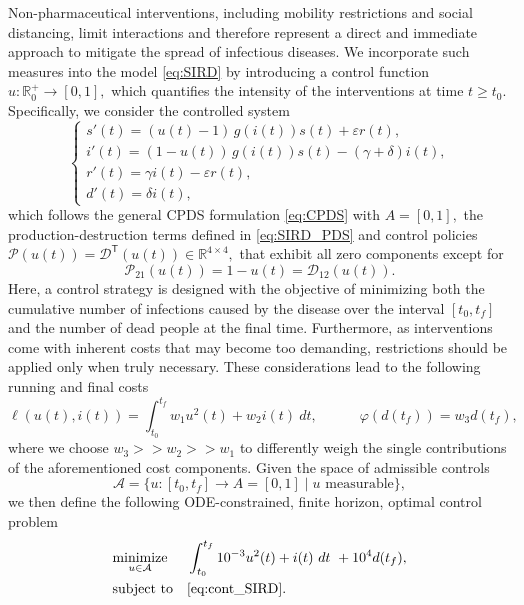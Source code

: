\documentclass[10pt]{article}
\theoremstyle{remark}
\newcommand{\R}{\mathbb{R}}
\newcommand{\tpose}{^\mathsf{T}}
\theoremstyle{definition}
\theoremstyle{remark}
\begin{document}
Non-pharmaceutical interventions, including mobility restrictions and social distancing, limit interactions and therefore represent a direct and immediate approach to mitigate the spread of infectious diseases. We incorporate such measures into the model \eqref{eq:SIRD} by introducing a control function $u: \mathbb{R}^+_0 \to [0,1],$ which quantifies the intensity of the interventions at time $t\geq t_0.$ Specifically, we consider the controlled system
\begin{equation}\label{eq:cont_SIRD}
    \begin{cases}
        s'(t) = (u(t)-1) \, g(i(t)) s(t) + \varepsilon r(t), \\
        i'(t) = (1-u(t)) \, g(i(t)) s(t) - (\gamma + \delta) i(t), \\
        r' (t) = \gamma i(t) - \varepsilon r(t), \\
        d'(t) = \delta i(t),
    \end{cases}
\end{equation}
which follows the general CPDS formulation \eqref{eq:CPDS} with $A=[0, 1],$ the production-destruction terms defined in \eqref{eq:SIRD_PDS} and control policies $\mathcal{P}(u(t))=\mathcal{D}\tpose(u(t))\in \R^{4\times4},$ that exhibit all zero components except for
\begin{equation*}
     \mathcal{P}_{21}(u(t))=1-u(t)=\mathcal{D}_{12}(u(t)).
\end{equation*}
Here, a control strategy is designed with the objective of minimizing both the cumulative number of infections caused by the disease over the interval $[t_0,t_f]$ and the number of dead people at the final time.  Furthermore, as interventions come with inherent costs that may become too demanding, restrictions should be applied only when truly necessary.
These considerations lead to the following running and final costs
\begin{equation*}
    \ell(u(t),i(t)) = \int_{t_0}^{t_f} w_1 u^2(t) + w_2 i(t) \ dt , \qquad \quad \varphi(d(t_f)) = w_3 d(t_f),
\end{equation*}
where we choose $w_3>>w_2>>w_1$ to differently weigh the single contributions of the aforementioned cost components. Given the space of admissible controls 
\begin{equation*}
    \mathcal{A}=\{u : [t_0, t_f] \to A=[0, 1] \; |\; u \text{ measurable} \},
\end{equation*}
we then define the following ODE-constrained, finite horizon, optimal control problem
\begin{equation}\label{eq:Opt_Cntr_SIRD}
    \begin{aligned}
    & \underset{u\in \mathcal{A}}{\text{minimize}}
    & & \int_{t_0}^{t_f} 10^{-3} u^2(t) + i(t) \ dt \ +  10^4 d(t_f), \\
    & \text{subject to} 
    & & \eqref{eq:cont_SIRD}.
    \end{aligned}
\end{equation}
\end{document}
